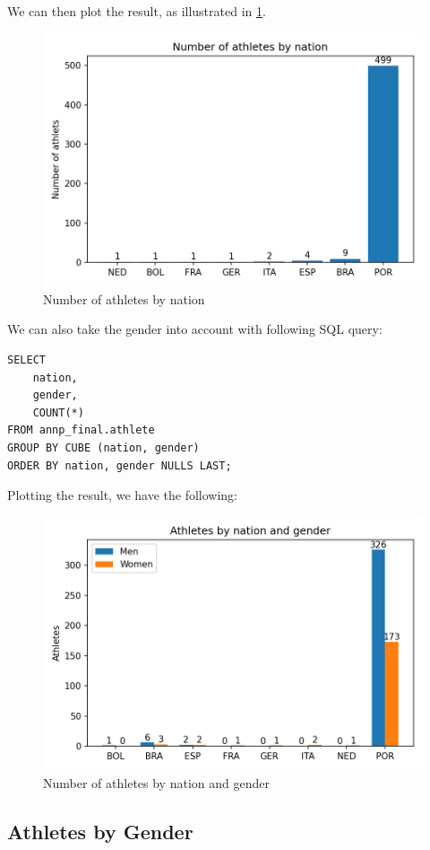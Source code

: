 \documentclass[a4paper, 11pt]{article}
\begin{document}
We can then plot the result, as illustrated in \cref{fig:athletesbynation}.

\begin{figure}[H]
    \centering
    \includegraphics[width=.65\textwidth]{img/athletesbynation.png}
    \caption{Number of athletes by nation}
    \label{fig:athletesbynation}
\end{figure}

We can also take the gender into account with following SQL query:

\begin{verbatim}
SELECT 
    nation,
    gender,
    COUNT(*)
FROM annp_final.athlete
GROUP BY CUBE (nation, gender)
ORDER BY nation, gender NULLS LAST;
\end{verbatim}

Plotting the result, we have the following:

\begin{figure}[H]
    \centering
    \includegraphics[width=.65\textwidth]{img/athletesbynationgender.png}
    \caption{Number of athletes by nation and gender}
    \label{fig:athletesbynationgender}
\end{figure}

\subsection{Athletes by Gender}
\end{document}

